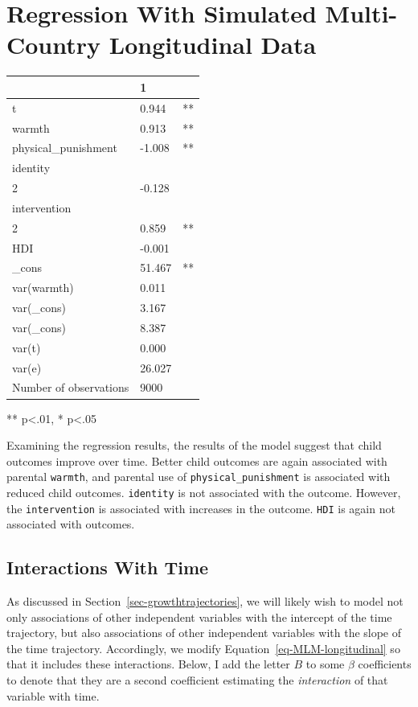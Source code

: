 \documentclass[
  letterpaper,
  DIV=11,
  numbers=noendperiod]{scrreprt}
\begin{document}
\section{Regression With Simulated Multi-Country Longitudinal
Data}\label{sec-regressionlongitudinal}

\begin{longtable}[]{@{}lll@{}}
\toprule\noalign{}
& 1 & \\
\midrule\noalign{}
\endhead
\bottomrule\noalign{}
\endlastfoot
t & 0.944 & ** \\
warmth & 0.913 & ** \\
physical\_punishment & -1.008 & ** \\
identity & & \\
2 & -0.128 & \\
intervention & & \\
2 & 0.859 & ** \\
HDI & -0.001 & \\
\_cons & 51.467 & ** \\
var(warmth) & 0.011 & \\
var(\_cons) & 3.167 & \\
var(\_cons) & 8.387 & \\
var(t) & 0.000 & \\
var(e) & 26.027 & \\
Number of observations & 9000 & \\
\end{longtable}

** p\textless.01, * p\textless.05

Examining the regression results, the results of the model suggest that
child outcomes improve over time. Better child outcomes are again
associated with parental \texttt{warmth}, and parental use of
\texttt{physical\_punishment} is associated with reduced child outcomes.
\texttt{identity} is not associated with the outcome. However, the
\texttt{intervention} is associated with increases in the outcome.
\texttt{HDI} is again not associated with outcomes.

\subsection{Interactions With Time}\label{interactions-with-time}

As discussed in Section~\ref{sec-growthtrajectories}, we will likely
wish to model not only associations of other independent variables with
the intercept of the time trajectory, but also associations of other
independent variables with the slope of the time trajectory.
Accordingly, we modify Equation~\ref{eq-MLM-longitudinal} so that it
includes these interactions. Below, I add the letter \(B\) to some
\(\beta\) coefficients to denote that they are a second coefficient
estimating the \emph{interaction} of that variable with time.
\end{document}

